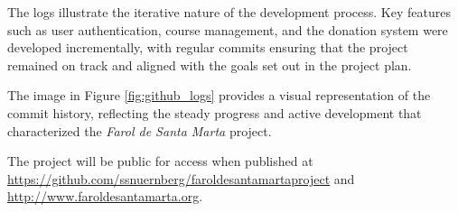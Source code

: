 The logs illustrate the iterative nature of the development process. Key features such as user authentication, course management, and the donation system were developed incrementally, with regular commits ensuring that the project remained on track and aligned with the goals set out in the project plan.

The image in Figure \ref{fig:github_logs} provides a visual representation of the commit history, reflecting the steady progress and active development that characterized the \textit{Farol de Santa Marta} project.

The project will be public for access when published at \url{https://github.com/ssnuernberg/faroldesantamartaproject} and \url{http://www.faroldesantamarta.org}.



